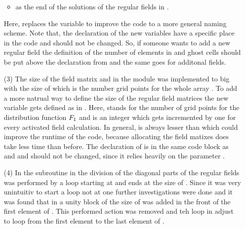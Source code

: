 \begin{enumerate}
\begin{itemize}
        \item {} as the end of the solutions of the regular fields in .
    \end{itemize}
    Here,  replaces the variable  to improve the code to a more general naming scheme. Note that, the declaration of the new variables have a specific place in the code and should not be changed. So, if someone wants to add a new regular field the definition of the number of elements in  and ghost cells should be put above the declaration from  and  the same goes for additonal fields. 
    \newpage
    \item[(3)] The size of the field matrix  and  in the module  was implemented to big with the size of  which is the number grid points for the whole array . To add a more natrual way to define the size of the regular field matrices the new variable  gets defined as  in . Here,  stands for the number of grid points for the distribution function $F_1$ and  is an integer which gets incremented by one for every activated field calculation. In general,  is always lesser than  which could improve the runtime of the code, because allocating the field matixes does take less time than before. The declaration of  is in the same code block as  and  and should not be changed, since it relies heavily on the parameter .
    \item[(4)] In the subroutine  in  the division of the diagonal parts of the regular fields was performed by a loop starting at  and ends at the size of . Since it was very unintuitiv to start a loop not at one further investigations were done and it was found that in  a unity block of the size of  was added in the front of the first element of . This performed action was removed and teh loop in  adjust to loop from the first element to the last element of .
\end{enumerate} 

